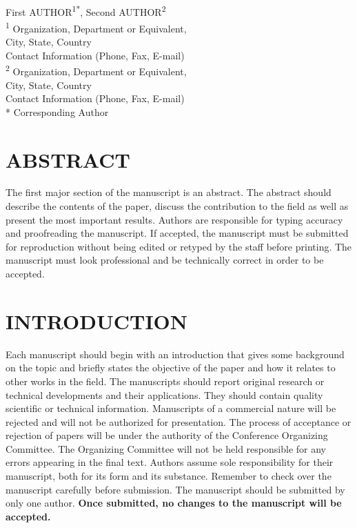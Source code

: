 \documentclass[10pt]{extarticle}
\begin{document}
	
\begin{center}
\vspace{0.2in}
\\[14pt]

{\fontsize{11pt}{1.2em}\selectfont
First AUTHOR\textsuperscript{1*}, Second AUTHOR\textsuperscript{2}
\\[11pt]
\textsuperscript{1} Organization, Department or Equivalent,\\
City, State, Country\\
Contact Information (Phone, Fax, E-mail)
\\[11pt]
\textsuperscript{2} Organization, Department or Equivalent,\\
City, State, Country\\
Contact Information (Phone, Fax, E-mail)\\[11pt]
* Corresponding Author
\\[33pt]
}
\end{center}

\section*{ABSTRACT}

The first major section of the manuscript is an abstract.  The abstract should describe the contents of the paper, discuss the contribution to the field as well as present the most important results.  Authors are responsible for typing accuracy and proofreading the manuscript.  If accepted, the manuscript must be submitted for reproduction without being edited or retyped by the staff before printing.  The manuscript must look professional and be technically correct in order to be accepted. 

\section{INTRODUCTION}

Each manuscript should begin with an introduction that gives some background on the topic and briefly states the objective of the paper and how it relates to other works in the field.  The manuscripts should report original research or technical developments and their applications.  They should contain quality scientific or technical information.  Manuscripts of a commercial nature will be rejected and will not be authorized for presentation.  The process of acceptance or rejection of papers will be under the authority of the Conference Organizing Committee.  The Organizing Committee will not be held responsible for any errors appearing in the final text.  Authors assume sole responsibility for their manuscript, both for its form and its substance.  Remember to check over the manuscript carefully before submission.  The manuscript should be submitted by only one author. \textbf{Once submitted, no changes to the manuscript will be accepted.} 
\end{document}
